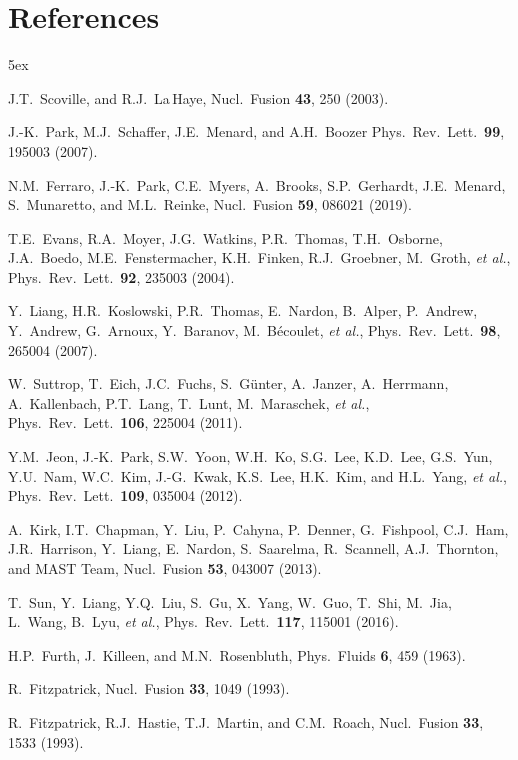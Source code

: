\documentclass[12pt,prb,aps]{revtex4-1}
\begin{document}
\section*{References}
\begin{thebibliography}{99}\baselineskip 5ex

 J.T.~Scoville, and R.J.~La\,Haye, Nucl.\ Fusion {\bf 43}, 250 (2003).

  J.-K.~Park, M.J.~Schaffer, J.E.~Menard, and A.H.~Boozer  Phys.\  Rev.\  Lett.\  {\bf 99}, 195003 (2007).

 N.M.~Ferraro, J.-K.~Park, C.E.~Myers, A.~Brooks, S.P.~Gerhardt, J.E.~Menard, S.~Munaretto, and M.L.~Reinke, Nucl.\ Fusion {\bf 59}, 086021 (2019).

  T.E.~Evans, R.A.~Moyer, J.G.~Watkins, P.R.~Thomas, T.H.~Osborne, J.A.~Boedo, M.E.~Fenstermacher, K.H.~Finken, R.J.~Groebner, M.~Groth, {\it et al.},  
Phys.\ Rev.\ Lett.\ {\bf 92}, 235003 (2004).

 Y.~Liang,  H.R.~Koslowski, P.R.~Thomas, E.~Nardon, B.~Alper, P.~Andrew, Y.~Andrew, G.~Arnoux,  Y.~Baranov, M.~B\'{e}coulet, {\it et al.},  
Phys.\ Rev.\ Lett.\ {\bf 98}, 265004 (2007).

 W.~Suttrop,  T.~Eich, J.C.~Fuchs, S.~G\"{u}nter, A.~Janzer, A.~Herrmann, A.~Kallenbach, P.T.~Lang, T.~Lunt, M.~Maraschek, {\it et al.},   
Phys.\ Rev.\ Lett.\ {\bf 106}, 225004 (2011).

 Y.M.~Jeon,  J.-K.~Park, S.W.~Yoon, W.H.~Ko, S.G.~Lee, K.D.~Lee, G.S.~Yun, Y.U.~Nam, W.C.~Kim, J.-G.~Kwak, K.S.~Lee, H.K.~Kim, and H.L.~Yang, {\it et al.}, 
Phys.\ Rev.\ Lett.\ {\bf 109}, 035004 (2012).

 A.~Kirk, I.T.~Chapman, Y.~Liu, P.~Cahyna, P.~Denner, G.~Fishpool, C.J.~Ham, J.R.~Harrison, Y.~Liang, E.~Nardon, S.~Saarelma, R.~Scannell, A.J.~Thornton, and  MAST Team, 
Nucl.\  Fusion {\bf 53}, 043007 (2013).

 T.~Sun,  Y.~Liang, Y.Q.~Liu, S.~Gu, X.~Yang, W.~Guo, T.~Shi, M.~Jia, L.~Wang, B.~Lyu, {\it et al.},  
Phys.\ Rev.\ Lett.\  {\bf 117}, 115001 (2016).

 H.P.~Furth,  J.~Killeen, and M.N.~Rosenbluth,  Phys.\ Fluids {\bf 6}, 459 (1963).

 R.~Fitzpatrick, Nucl.\ Fusion {\bf 33}, 1049 (1993).

 R.~Fitzpatrick, R.J.~Hastie, T.J.~Martin, and C.M.~Roach, Nucl.\ Fusion {\bf 33}, 1533 (1993).


\end{thebibliography}
\end{document}
